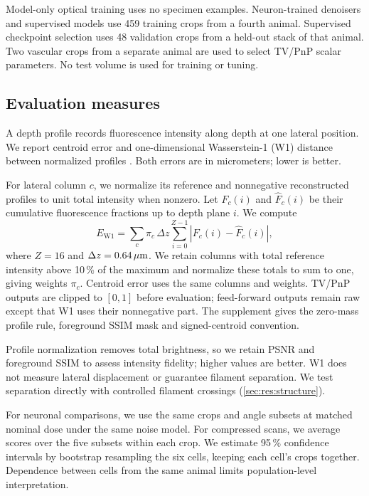 Model-only optical training uses no specimen examples. Neuron-trained denoisers and supervised models use 459 training crops from a fourth animal. Supervised checkpoint selection uses 48 validation crops from a held-out stack of that animal. Two vascular crops from a separate animal are used to select TV/PnP scalar parameters. No test volume is used for training or tuning.

\subsection{Evaluation measures}

A depth profile records fluorescence intensity along depth at one lateral position. We report centroid error and one-dimensional Wasserstein-1 (W1) distance between normalized profiles \cite{peyre2019}. Both errors are in micrometers; lower is better.

For lateral column $c$, we normalize its reference and nonnegative reconstructed profiles to unit total intensity when nonzero. Let $F_c(i)$ and $\hat F_c(i)$ be their cumulative fluorescence fractions up to depth plane $i$. We compute
\begin{equation}
E_{\mathrm{W1}}=\sum_c\pi_c\,\Delta z\sum_{i=0}^{Z-1}\left|F_c(i)-\hat F_c(i)\right|,
\label{eq:w1}
\end{equation}
where $Z=16$ and $\Delta z=0.64\,\mu\mathrm{m}$. We retain columns with total reference intensity above 10\,\% of the maximum and normalize these totals to sum to one, giving weights $\pi_c$. Centroid error uses the same columns and weights. TV/PnP outputs are clipped to $[0,1]$ before evaluation; feed-forward outputs remain raw except that W1 uses their nonnegative part. The supplement gives the zero-mass profile rule, foreground SSIM mask and signed-centroid convention.

Profile normalization removes total brightness, so we retain PSNR and foreground SSIM to assess intensity fidelity; higher values are better. W1 does not measure lateral displacement or guarantee filament separation. We test separation directly with controlled filament crossings (\cref{sec:res:structure}).

For neuronal comparisons, we use the same crops and angle subsets at matched nominal dose under the same noise model. For compressed scans, we average scores over the five subsets within each crop. We estimate 95\,\% confidence intervals by bootstrap resampling the six cells, keeping each cell's crops together. Dependence between cells from the same animal limits population-level interpretation.
